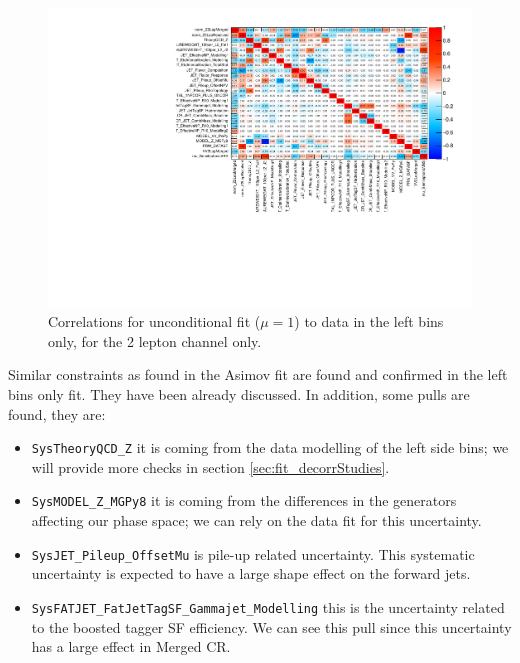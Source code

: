\begin{figure}[ht]
      \centering
        \includegraphics[width=\linewidth]{figures/2lep/FitResults/corr_HighCorrNoMCStat_DataLeftbins.pdf}
        \caption{Correlations for unconditional fit ($\mu=1$) to data in the left bins only, for the 2 lepton channel only.}
       \label{fig:fit_2lep_corr_left}
\end{figure}

Similar constraints as found in the Asimov fit are found and confirmed in the left bins only fit.
They have been already discussed.
In addition, some pulls are found, they are:

\begin{itemize}

       \item \texttt{SysTheoryQCD\_Z} it is coming from the data modelling of the left side bins;
       we will provide more checks in section \ref{sec:fit_decorrStudies}.

       \item \texttt{SysMODEL\_Z\_MGPy8} it is coming from the differences in the generators affecting our phase space;
       we can rely on the data fit for this uncertainty.

       \item \texttt{SysJET\_Pileup\_OffsetMu} is pile-up related uncertainty.
       This systematic uncertainty is expected to have a large shape effect on the forward jets.

       \item \texttt{SysFATJET\_FatJetTagSF\_Gammajet\_Modelling} this is the uncertainty related to the boosted tagger SF efficiency.
       We can see this pull since this uncertainty has a large effect in Merged CR.
\end{itemize}





